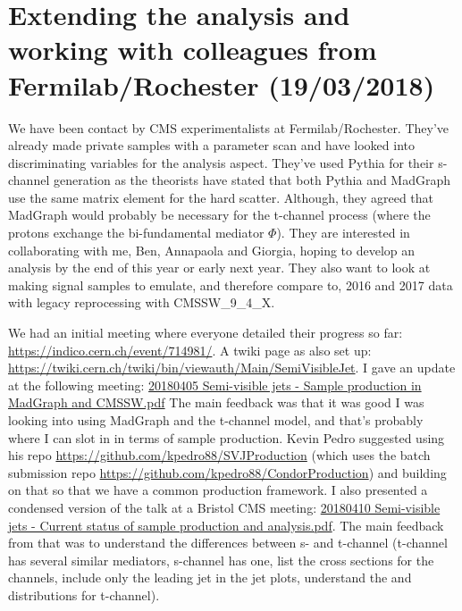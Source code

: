 

\section{Extending the analysis and working with colleagues from Fermilab/Rochester (19/03/2018)}

We have been contact by CMS experimentalists at Fermilab/Rochester. They've already made private samples with a parameter scan and have looked into discriminating variables for the analysis aspect. They've used Pythia for their s-channel generation as the theorists have stated that both Pythia and MadGraph use the same matrix element for the hard scatter. Although, they agreed that MadGraph would probably be necessary for the t-channel process (where the protons exchange the bi-fundamental mediator $\Phi$). They are interested in collaborating with me, Ben, Annapaola and Giorgia, hoping to develop an analysis by the end of this year or early next year. They also want to look at making signal samples to emulate, and therefore compare to, 2016 and 2017 data with legacy reprocessing with CMSSW\_9\_4\_X.

We had an initial meeting where everyone detailed their progress so far: \url{https://indico.cern.ch/event/714981/}. A twiki page as also set up: \url{https://twiki.cern.ch/twiki/bin/viewauth/Main/SemiVisibleJet}. I gave an update at the following meeting: \href{run:modules/Sec 35 - Semi-visible jets analysis/figures/20180405 Semi-visible jets - Sample production in MadGraph and CMSSW.pdf}{20180405 Semi-visible jets - Sample production in MadGraph and CMSSW.pdf} The main feedback was that it was good I was looking into using MadGraph and the t-channel model, and that's probably where I can slot in in terms of sample production. Kevin Pedro suggested using his repo \url{https://github.com/kpedro88/SVJProduction} (which uses the batch submission repo \url{https://github.com/kpedro88/CondorProduction}) and building on that so that we have a common production framework. I also presented a condensed version of the talk at a Bristol CMS meeting: \href{run:modules/Sec 35 - Semi-visible jets analysis/figures/20180410 Semi-visible jets - Current status of sample production and analysis.pdf}{20180410 Semi-visible jets - Current status of sample production and analysis.pdf}. The main feedback from that was to understand the differences between s- and t-channel (t-channel has several similar mediators, s-channel has one, list the cross sections for the channels, include only the leading jet \pt in the jet \pt plots, understand the \njet and \etmiss distributions for t-channel).

